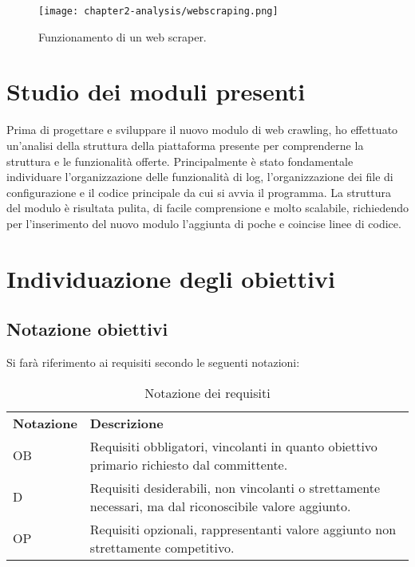 \begin{figure}[!h] 
    \centering 
    \texttt{[image: chapter2-analysis/webscraping.png]} 
    \caption{Funzionamento di un web scraper.}
\end{figure}


\section{Studio dei moduli presenti}

Prima di progettare e sviluppare il nuovo modulo di web crawling, ho effettuato un’analisi della struttura della piattaforma presente per comprenderne la struttura e le funzionalità offerte. Principalmente è stato fondamentale individuare l'organizzazione delle funzionalità di log, l'organizzazione dei file di configurazione e il codice principale da cui si avvia il programma. La struttura del modulo è risultata pulita, di facile comprensione e molto scalabile, richiedendo per l'inserimento del nuovo modulo l'aggiunta di poche e coincise linee di codice.


\section{Individuazione degli obiettivi}

\subsection{Notazione obiettivi}
Si farà riferimento ai requisiti secondo le seguenti notazioni:
\begin{longtable}{|p{}|p{}|}
	\caption{Notazione dei requisiti}
	\label{tab:notazione-requisiti} \\
	\hline
    \textbf{Notazione}	&	\textbf{Descrizione} \\
    OB			&	Requisiti obbligatori, vincolanti in quanto obiettivo primario richiesto dal committente. \\  
	\hline
    D			&	Requisiti desiderabili, non vincolanti o strettamente necessari, ma dal riconoscibile valore aggiunto. \\ 
	\hline
    OP			&	Requisiti opzionali, rappresentanti valore aggiunto non strettamente competitivo. \\
    \hline
\end{longtable}%


